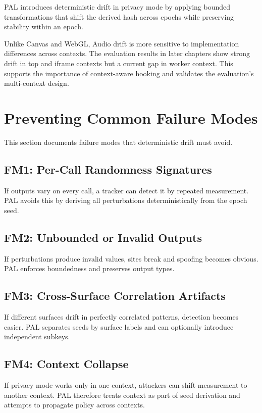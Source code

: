 \documentclass[11pt]{report}
\begin{document}
PAL introduces deterministic drift in privacy mode by applying bounded transformations that shift the derived hash across epochs while preserving stability within an epoch.

Unlike Canvas and WebGL, Audio drift is more sensitive to implementation differences across contexts. The evaluation results in later chapters show strong drift in top and iframe contexts but a current gap in worker context. This supports the importance of context-aware hooking and validates the evaluation’s multi-context design.

\section{Preventing Common Failure Modes}

This section documents failure modes that deterministic drift must avoid.

\subsection{FM1: Per-Call Randomness Signatures}

If outputs vary on every call, a tracker can detect it by repeated measurement. PAL avoids this by deriving all perturbations deterministically from the epoch seed.

\subsection{FM2: Unbounded or Invalid Outputs}

If perturbations produce invalid values, sites break and spoofing becomes obvious. PAL enforces boundedness and preserves output types.

\subsection{FM3: Cross-Surface Correlation Artifacts}

If different surfaces drift in perfectly correlated patterns, detection becomes easier. PAL separates seeds by surface labels and can optionally introduce independent subkeys.

\subsection{FM4: Context Collapse}

If privacy mode works only in one context, attackers can shift measurement to another context. PAL therefore treats context as part of seed derivation and attempts to propagate policy across contexts.
\end{document}
